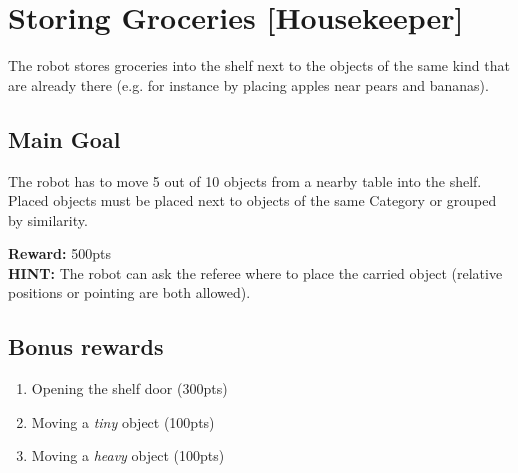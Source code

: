 \section{Storing Groceries [Housekeeper]}
The robot stores groceries into the shelf next to the objects of the same kind that are already there (e.g. for instance by placing apples near pears and bananas).


\subsection{Main Goal}
The robot has to move 5 out of 10 objects from a nearby table into the shelf. Placed objects must be placed next to objects of the same Category or grouped by similarity.

\noindent\textbf{Reward:} 500pts\\

\noindent\textbf{HINT:} The robot can ask the referee where to place the carried object (relative positions or pointing are both allowed).

\subsection{Bonus rewards}
\begin{enumerate}[nosep]
	\item Opening the shelf door (300pts)
	\item Moving a \emph{tiny} object (100pts)
	\item Moving a \emph{heavy} object (100pts)
\end{enumerate}

%
%
